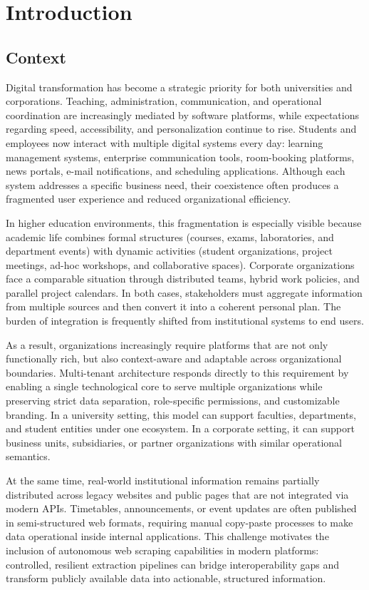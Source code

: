 \chapter{Introduction}

\label{intro}

\section{Context}
Digital transformation has become a strategic priority for both universities and corporations. Teaching, administration, communication, and operational coordination are increasingly mediated by software platforms, while expectations regarding speed, accessibility, and personalization continue to rise. Students and employees now interact with multiple digital systems every day: learning management systems, enterprise communication tools, room-booking platforms, news portals, e-mail notifications, and scheduling applications. Although each system addresses a specific business need, their coexistence often produces a fragmented user experience and reduced organizational efficiency.

In higher education environments, this fragmentation is especially visible because academic life combines formal structures (courses, exams, laboratories, and department events) with dynamic activities (student organizations, project meetings, ad-hoc workshops, and collaborative spaces). Corporate organizations face a comparable situation through distributed teams, hybrid work policies, and parallel project calendars. In both cases, stakeholders must aggregate information from multiple sources and then convert it into a coherent personal plan. The burden of integration is frequently shifted from institutional systems to end users.

As a result, organizations increasingly require platforms that are not only functionally rich, but also context-aware and adaptable across organizational boundaries. Multi-tenant architecture responds directly to this requirement by enabling a single technological core to serve multiple organizations while preserving strict data separation, role-specific permissions, and customizable branding. In a university setting, this model can support faculties, departments, and student entities under one ecosystem. In a corporate setting, it can support business units, subsidiaries, or partner organizations with similar operational semantics.

At the same time, real-world institutional information remains partially distributed across legacy websites and public pages that are not integrated via modern APIs. Timetables, announcements, or event updates are often published in semi-structured web formats, requiring manual copy-paste processes to make data operational inside internal applications. This challenge motivates the inclusion of autonomous web scraping capabilities in modern platforms: controlled, resilient extraction pipelines can bridge interoperability gaps and transform publicly available data into actionable, structured information.

